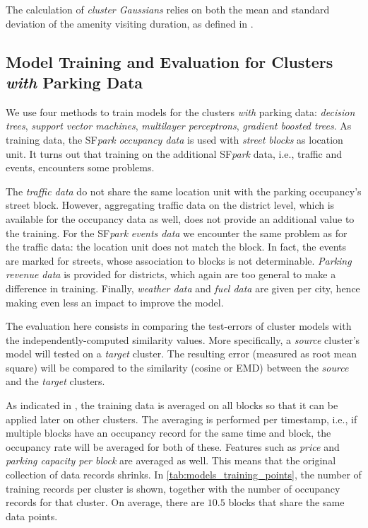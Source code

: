 The calculation of \textit{cluster Gaussians} relies on both the mean and standard deviation of the amenity visiting duration, as defined in .

\subsection{Model Training and Evaluation for Clusters \emph{with} Parking Data}
\label{evaluation:model_training}
We use four methods to train models for the clusters \textit{with} parking data: \textit{decision trees}, \textit{support vector machines}, \textit{multilayer perceptrons}, \textit{gradient boosted trees}. As training data, the SF\textit{park} \textit{occupancy data} is used with \textit{street blocks} as location unit. It turns out that training on the additional SF\textit{park} data, i.e., traffic and events, encounters some problems. 

The \textit{traffic data} do not share the same location unit with the parking occupancy's street block. However, aggregating traffic data on the district level, which is available for the occupancy data as well, does not provide an additional value to the training. For the SF\textit{park} \textit{events data} we encounter the same problem as for the traffic data: the location unit does not match the block.
In fact, the events are marked for streets, whose association to blocks is not determinable. \textit{Parking revenue data} is provided for districts, which again are too general to make a difference in training.
Finally, \textit{weather data} and \textit{fuel data} are given per city, hence making even less an impact to improve the model.

The evaluation here consists in comparing the test-errors of cluster models with the independently-computed similarity values. More specifically, a \textit{source} cluster's model will tested on a \textit{target} cluster. The resulting error (measured as root mean square) will be compared to the similarity (cosine or EMD) between the \textit{source} and the \textit{target} clusters.  

As indicated in , the training data is averaged on all blocks so that it can be applied later on other clusters. The averaging is performed per timestamp, i.e., if multiple blocks have an occupancy record for the same time and block, the occupancy rate will be averaged for both of these. Features such as \textit{price} and \textit{parking capacity per block} are averaged as well. This means that the original collection of data records shrinks. In \autoref{tab:models_training_points}, the number of training records per cluster is shown, together with the number of occupancy records for that cluster. On average, there are $10.5$ blocks that share the same data points.


